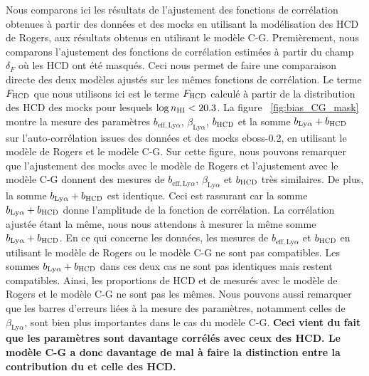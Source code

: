 \documentclass[11pt, twoside, a4paper, openright]{report}
\begin{document}
Nous comparons ici les résultats de l'ajustement des fonctions de corrélation obtenues à partir des données et des mocks en utilisant la modélisation des HCD de Rogers, aux résultats obtenus en utilisant le modèle C-G.
Premièrement, nous comparons l'ajustement des fonctions de corrélation estimées à partir du champ $\delta_F$ où les HCD ont été masqués. Ceci nous permet de faire une comparaison directe des deux modèles ajustés sur les mêmes fonctions de corrélation.
Le terme $F_{\textsc{HCD}}$ que nous utilisons ici est le terme $F_{\textsc{HCD}}$ calculé à partir de la distribution des HCD des mocks pour lesquels $\log n_{\textsc{HI}} < \num{20.3}$.
La figure ~\ref{fig:bias_CG_mask} montre la mesure des paramètres $b_{\mathrm{eff},\mathrm{Ly}\alpha}$, $\beta_{\mathrm{Ly}\alpha}$, $b_{\textsc{HCD}}$ et la somme  $b_{\mathrm{Ly}\alpha} + b_{\textsc{HCD}}$ sur l'auto-corrélation issues des données et des mocks eboss-0.2, en utilisant le modèle de Rogers et le modèle C-G.
Sur cette figure, nous pouvons remarquer que l'ajustement des mocks avec le modèle de Rogers et l'ajustement avec le modèle C-G donnent des mesures de $b_{\mathrm{eff},\mathrm{Ly}\alpha}$, $\beta_{\mathrm{Ly}\alpha}$ et $b_{\textsc{HCD}}$ très similaires. De plus, la somme  $b_{\mathrm{Ly}\alpha} + b_{\textsc{HCD}}$ est identique.
Ceci est rassurant car la somme $b_{\mathrm{Ly}\alpha} + b_{\textsc{HCD}}$ donne l'amplitude de la fonction de corrélation. La corrélation ajustée étant la même, nous nous attendons à mesurer la même somme $b_{\mathrm{Ly}\alpha} + b_{\textsc{HCD}}$.
En ce qui concerne les données, les mesures de $b_{\mathrm{eff},\mathrm{Ly}\alpha}$ et $b_{\textsc{HCD}}$ en utilisant le modèle de Rogers ou le modèle C-G ne sont pas compatibles. Les sommes  $b_{\mathrm{Ly}\alpha} + b_{\textsc{HCD}}$ dans ces deux cas ne sont pas identiques mais restent compatibles. Ainsi, les proportions de HCD et de \lya{} mesurés avec le modèle de Rogers et le modèle C-G ne sont pas les mêmes.
Nous pouvons aussi remarquer que les barres d'erreurs liées à la mesure des paramètres, notamment celles de $\beta_{\mathrm{Ly}\alpha}$, sont bien plus importantes dans le cas du modèle C-G.
\textbf{Ceci vient du fait que les paramètres \lya{} sont davantage corrélés avec ceux des HCD. Le modèle C-G a donc davantage de mal à faire la distinction entre la contribution du \lya{} et celle des HCD.}
\end{document}
